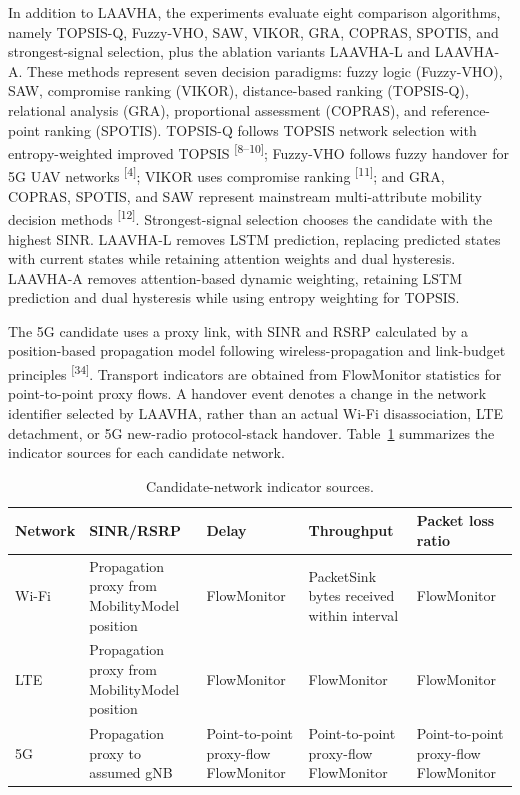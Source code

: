 \documentclass[10pt,a4paper]{article}
\newcommand{\upcite}[1]{\textsuperscript{[#1]}}
\begin{document}
In addition to LAAVHA, the experiments evaluate eight comparison algorithms, namely TOPSIS-Q, Fuzzy-VHO, SAW, VIKOR, GRA, COPRAS, SPOTIS, and strongest-signal selection, plus the ablation variants LAAVHA-L and LAAVHA-A. These methods represent seven decision paradigms: fuzzy logic (Fuzzy-VHO), SAW, compromise ranking (VIKOR), distance-based ranking (TOPSIS-Q), relational analysis (GRA), proportional assessment (COPRAS), and reference-point ranking (SPOTIS). TOPSIS-Q follows TOPSIS network selection with entropy-weighted improved TOPSIS \upcite{8--10}; Fuzzy-VHO follows fuzzy handover for 5G UAV networks \upcite{4}; VIKOR uses compromise ranking \upcite{11}; and GRA, COPRAS, SPOTIS, and SAW represent mainstream multi-attribute mobility decision methods \upcite{12}. Strongest-signal selection chooses the candidate with the highest SINR. LAAVHA-L removes LSTM prediction, replacing predicted states with current states while retaining attention weights and dual hysteresis. LAAVHA-A removes attention-based dynamic weighting, retaining LSTM prediction and dual hysteresis while using entropy weighting for TOPSIS.

The 5G candidate uses a proxy link, with SINR and RSRP calculated by a position-based propagation model following wireless-propagation and link-budget principles \upcite{34}. Transport indicators are obtained from FlowMonitor statistics for point-to-point proxy flows. A handover event denotes a change in the network identifier selected by LAAVHA, rather than an actual Wi-Fi disassociation, LTE detachment, or 5G new-radio protocol-stack handover. Table~\ref{tab:metrics} summarizes the indicator sources for each candidate network.

\begin{table}[H]
\centering
\caption{Candidate-network indicator sources.}
\small
\begin{tabular}{p{1.5cm}p{3.2cm}p{2.8cm}p{3cm}p{2.5cm}}
\toprule
Network & SINR/RSRP & Delay & Throughput & Packet loss ratio \\
\midrule
Wi-Fi & Propagation proxy from MobilityModel position & FlowMonitor & PacketSink bytes received within interval & FlowMonitor \\
LTE & Propagation proxy from MobilityModel position & FlowMonitor & FlowMonitor & FlowMonitor \\
5G & Propagation proxy to assumed gNB & Point-to-point proxy-flow FlowMonitor & Point-to-point proxy-flow FlowMonitor & Point-to-point proxy-flow FlowMonitor \\
\bottomrule
\end{tabular}
\label{tab:metrics}
\end{table}
\end{document}

